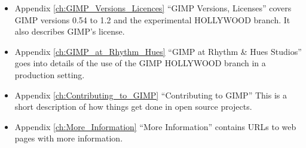 \begin{itemize}

\item Appendix  \ref{ch:GIMP_Versions_Licences} ``GIMP Versions, Licenses''
covers GIMP versions 0.54 to 1.2 and the experimental HOLLYWOOD branch. It also
describes GIMP's license.
  
\item Appendix  \ref{ch:GIMP_at_Rhythm_Hues}  ``GIMP at Rhythm \& Hues
Studios'' goes into details of the use of the GIMP HOLLYWOOD branch in a
production setting. 

\item Appendix \ref{ch:Contributing_to_GIMP} ``Contributing to GIMP'' This is a
short description of how things get done in open source projects.

\item Appendix \ref{ch:More_Information} ``More Information'' contains URLs to
web pages with more information.

\end{itemize}
